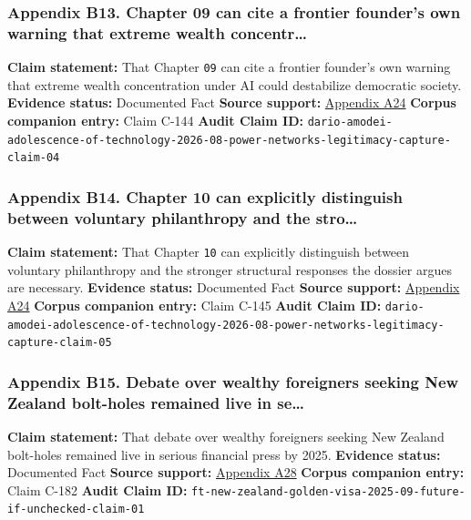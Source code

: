 \documentclass[
  american,
  11pt,
  letterpaper,
]{article}
\begin{document}
\subsubsection{Appendix B13. Chapter 09 can cite a frontier founder's
own warning that extreme wealth
concentr\ldots{}}\label{ch-10-appendix-b13-chapter-09-can-cite-a-frontier-founder-s-own-warning-that-extreme-wealth-concentr}

\textbf{Claim statement:} That Chapter \texttt{09} can cite a frontier
founder's own warning that extreme wealth concentration under AI could
destabilize democratic society. \textbf{Evidence status:} Documented
Fact \textbf{Source support:}
\hyperref[ch-10-appendix-a24-the-adolescence-of-technology]{Appendix
A24} \textbf{Corpus companion entry:} Claim C-144 \textbf{Audit Claim
ID:}
\texttt{dario-amodei-adolescence-of-technology-2026-08-power-networks-legitimacy-capture-claim-04}

\subsubsection{Appendix B14. Chapter 10 can explicitly distinguish
between voluntary philanthropy and the
stro\ldots{}}\label{ch-10-appendix-b14-chapter-10-can-explicitly-distinguish-between-voluntary-philanthropy-and-the-stro}

\textbf{Claim statement:} That Chapter \texttt{10} can explicitly
distinguish between voluntary philanthropy and the stronger structural
responses the dossier argues are necessary. \textbf{Evidence status:}
Documented Fact \textbf{Source support:}
\hyperref[ch-10-appendix-a24-the-adolescence-of-technology]{Appendix
A24} \textbf{Corpus companion entry:} Claim C-145 \textbf{Audit Claim
ID:}
\texttt{dario-amodei-adolescence-of-technology-2026-08-power-networks-legitimacy-capture-claim-05}

\subsubsection{Appendix B15. Debate over wealthy foreigners seeking New
Zealand bolt-holes remained live in
se\ldots{}}\label{ch-10-appendix-b15-debate-over-wealthy-foreigners-seeking-new-zealand-bolt-holes-remained-live-in-se}

\textbf{Claim statement:} That debate over wealthy foreigners seeking
New Zealand bolt-holes remained live in serious financial press by 2025.
\textbf{Evidence status:} Documented Fact \textbf{Source support:}
\hyperref[ch-10-appendix-a28-new-zealand-woos-the-wealthy-with-golden-visa-changes]{Appendix
A28} \textbf{Corpus companion entry:} Claim C-182 \textbf{Audit Claim
ID:}
\texttt{ft-new-zealand-golden-visa-2025-09-future-if-unchecked-claim-01}
\end{document}
